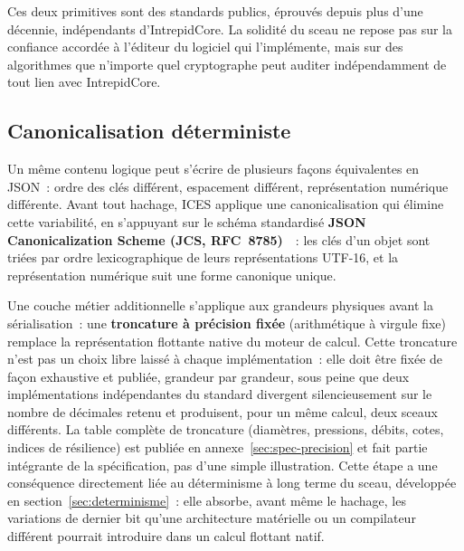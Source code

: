 \documentclass[11pt,a4paper]{article}
\begin{document}
Ces deux primitives sont des standards publics, éprouvés depuis plus d'une décennie, indépendants d'IntrepidCore. La solidité du sceau ne repose pas sur la confiance accordée à l'éditeur du logiciel qui l'implémente, mais sur des algorithmes que n'importe quel cryptographe peut auditer indépendamment de tout lien avec IntrepidCore.

\subsection{Canonicalisation déterministe}\label{sec:canon}

Un même contenu logique peut s'écrire de plusieurs façons équivalentes en JSON~: ordre des clés différent, espacement différent, représentation numérique différente. Avant tout hachage, ICES applique une canonicalisation qui élimine cette variabilité, en s'appuyant sur le schéma standardisé \textbf{JSON Canonicalization Scheme (JCS, RFC~8785)}~\cite{rfc8785}~: les clés d'un objet sont triées par ordre lexicographique de leurs représentations UTF-16, et la représentation numérique suit une forme canonique unique.

Une couche métier additionnelle s'applique aux grandeurs physiques avant la sérialisation~: une \textbf{troncature à précision fixée} (arithmétique à virgule fixe) remplace la représentation flottante native du moteur de calcul. Cette troncature n'est pas un choix libre laissé à chaque implémentation~: elle doit être fixée de façon exhaustive et publiée, grandeur par grandeur, sous peine que deux implémentations indépendantes du standard divergent silencieusement sur le nombre de décimales retenu et produisent, pour un même calcul, deux sceaux différents. La table complète de troncature (diamètres, pressions, débits, cotes, indices de résilience) est publiée en annexe~\ref{sec:spec-precision} et fait partie intégrante de la spécification, pas d'une simple illustration. Cette étape a une conséquence directement liée au déterminisme à long terme du sceau, développée en section~\ref{sec:determinisme}~: elle absorbe, avant même le hachage, les variations de dernier bit qu'une architecture matérielle ou un compilateur différent pourrait introduire dans un calcul flottant natif.
\end{document}
